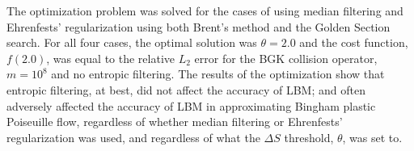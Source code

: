 The optimization problem was solved for the cases of using median filtering and Ehrenfests' regularization using both Brent's method and the Golden Section search.
For all four cases, the optimal solution was $\theta = 2.0$ and the cost function, $f(2.0)$, was equal to the relative $L_2$ error for the BGK collision operator, $m = 10^8$ and no entropic filtering.
The results of the optimization show that entropic filtering, at best, did not affect the accuracy of LBM; and often adversely affected the accuracy of LBM in approximating Bingham plastic Poiseuille flow, regardless of whether median filtering or Ehrenfests' regularization was used, and regardless of what the $\Delta S$ threshold, $\theta$, was set to.

\newcommand{\figwid}{0.48\linewidth}

